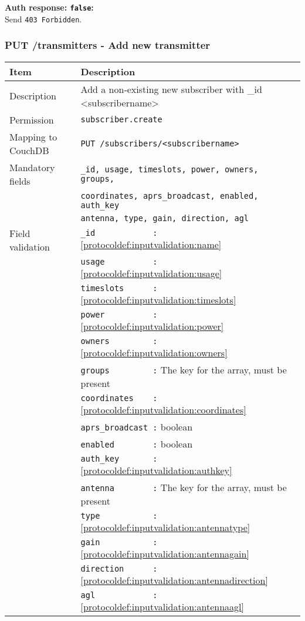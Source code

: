 \textbf{Auth response: \texttt{false}:}\\
Send \verb|403 Forbidden|.

\newpage
\subsubsection{PUT /transmitters - Add new transmitter}
\begin{table}[htbp]
  \begin{tabular}{|l|p{12cm}|} \hline
    Item               & Description  \\ \hline \hline
    Description        & Add a non-existing new subscriber with \_id <subscribername>\\ \hline
    Permission         & \verb|subscriber.create| \\ \hline
    Mapping to CouchDB & \verb|PUT /subscribers/<subscribername>|\\ \hline
    Mandatory fields   & \verb|_id, usage, timeslots, power, owners, groups,| \\
                       & \verb|coordinates, aprs_broadcast, enabled, auth_key|\\
                       & \verb|antenna, type, gain, direction, agl| \\ \hline
    Field validation   & \verb|_id            :| \ref{protocoldef:inputvalidation:name} \\
                       & \verb|usage          :| \ref{protocoldef:inputvalidation:usage}\\
                       & \verb|timeslots      :| \ref{protocoldef:inputvalidation:timeslots}\\
                       & \verb|power          :| \ref{protocoldef:inputvalidation:power} \\
                       & \verb|owners         :| \ref{protocoldef:inputvalidation:owners} \\
                       & \verb|groups         :| The key for the array, must be present \\ \hline
                       & \verb|coordinates    :| \ref{protocoldef:inputvalidation:coordinates} \\
                       & \verb|aprs_broadcast :| boolean \\
                       & \verb|enabled        :| boolean \\
                       & \verb|auth_key       :| \ref{protocoldef:inputvalidation:authkey} \\
                       & \verb|antenna        :| The key for the array, must be present \\
                       & \verb|type           :| \ref{protocoldef:inputvalidation:antennatype} \\
                       & \verb|gain           :| \ref{protocoldef:inputvalidation:antennagain}\\
                       & \verb|direction      :| \ref{protocoldef:inputvalidation:antennadirection}\\  
                       & \verb|agl            :| \ref{protocoldef:inputvalidation:antennaagl}\\ \hline
  \end{tabular}
\end{table}
